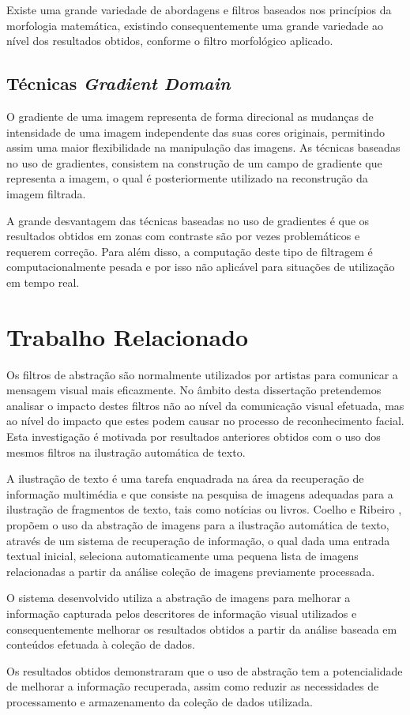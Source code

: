 Existe uma grande variedade de abordagens e filtros baseados nos princípios da morfologia matemática, existindo consequentemente uma grande variedade ao nível dos resultados obtidos, conforme o filtro morfológico aplicado.

\subsection{Técnicas \textit{Gradient Domain}}
O gradiente de uma imagem representa de forma direcional as mudanças de intensidade de uma imagem independente das suas cores originais, permitindo assim uma maior flexibilidade na manipulação das imagens. As técnicas baseadas no uso de gradientes, consistem na construção de um campo de gradiente que representa a imagem, o qual é posteriormente utilizado na reconstrução da imagem filtrada.

A grande desvantagem das técnicas baseadas no uso de gradientes é que os resultados obtidos em zonas com contraste são por vezes problemáticos e requerem correção. Para além disso, a computação deste tipo de filtragem é computacionalmente pesada e por isso não aplicável para situações de utilização em tempo real.

\section{Trabalho Relacionado}
Os filtros de abstração são normalmente utilizados por artistas para comunicar a mensagem visual mais eficazmente.  No âmbito desta dissertação pretendemos analisar o impacto destes filtros não ao nível da comunicação visual efetuada, mas ao nível do impacto que estes podem causar no processo de reconhecimento facial. Esta investigação é motivada por resultados anteriores obtidos com o uso dos mesmos filtros na ilustração automática de texto.

A ilustração de texto é uma tarefa enquadrada na área da recuperação de informação multimédia e que consiste na pesquisa de imagens adequadas para a ilustração de fragmentos de texto, tais como notícias ou livros. Coelho e Ribeiro  \cite{Coelho:2012:IAC:2260641.2260676}, propõem o uso da abstração de imagens para a ilustração automática de texto, através de um sistema de recuperação de informação, o qual dada uma entrada textual inicial, seleciona automaticamente uma pequena lista de imagens relacionadas a partir da análise coleção de imagens previamente processada.

O sistema desenvolvido utiliza a abstração de imagens para melhorar a informação capturada pelos descritores de informação visual utilizados e consequentemente melhorar os resultados obtidos a partir da análise baseada em conteúdos efetuada à coleção de dados.

Os resultados obtidos demonstraram que o uso de abstração tem a potencialidade de melhorar a informação recuperada, assim como reduzir as necessidades de processamento e armazenamento da coleção de dados utilizada.